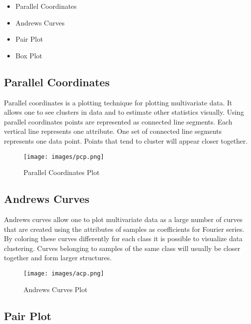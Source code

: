 \documentclass[11pt,letterpaper]{article}
\begin{document}
\begin{itemize}
\item Parallel Coordinates 
\item Andrews Curves
\item Pair Plot
\item Box Plot
\end{itemize}




\subsection*{Parallel Coordinates}





Parallel coordinates is a plotting technique for plotting multivariate data. It allows one to see clusters in data and to estimate other statistics visually. Using parallel coordinates points are represented as connected line segments. Each vertical line represents one attribute. One set of connected line segments represents one data point. Points that tend to cluster will appear closer together.


\begin{figure}[ht]
\centering
\label{fig:pcp}
\graphicspath{ {images/} }
\texttt{[image: images/pcp.png]}
\caption{Parallel Coordinates Plot}
\end{figure}

\subsection*{Andrews Curves }


 Andrews curves allow one to plot multivariate data as a large number of curves that are created using the attributes of samples as coefficients for Fourier series. By coloring these curves differently for each class it is possible to visualize data clustering. Curves belonging to samples of the same class will usually be closer together and form larger structures.

\begin{figure}[ht]
\centering
\label{fig:acp}
\graphicspath{ {images/} }
\texttt{[image: images/acp.png]}
\caption{Andrews Curves Plot}
\end{figure}



\subsection*{Pair Plot}
\end{document}
